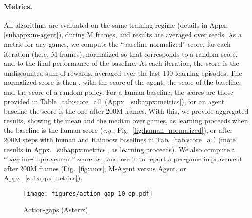 \documentclass{article}
\begin{document}
\paragraph{Metrics.}
All algorithms are evaluated on the same training regime (details in Appx.\ref{subappx:m-agent}), during M frames, and results are averaged over  seeds. As a metric for any games, we compute the ``baseline-normalized'' score, for each iteration (here, M frames), normalized so that  corresponds to a random score, and  to the final performance of the baseline. At each iteration, the score is the undiscounted sum of rewards, averaged over the last 100 learning episodes. The normalized score is then , with  the score of the agent,  the score of the baseline, and  the score of a random policy. For a human baseline, the scores are those provided in Table~\ref{tab:score_all} (Appx.~\ref{subappx:metrics}), for an agent baseline the score is the one after 200M frames. With this, we provide aggregated results, showing the mean and the median over games, as learning proceeds when the baseline is the human score (\textit{e.g.}, Fig.~\ref{fig:human_normalized}), or after 200M steps with human and Rainbow baselines in Tab.~\ref{tab:score_all} (more results in Appx.~\ref{subappx:metrics}, as learning proceeds). We also compute a ``baseline-improvement'' score as , and use it to report a per-game improvement after 200M frames (Fig.~\ref{fig:aucs}, M-Agent versus Agent, or Appx.~\ref{subappx:metrics}).


\begin{wrapfigure}{r}{0.41\textwidth}
\vspace{-25pt}
    \centering
    \texttt{[image: figures/action\_gap\_10\_ep.pdf]}
    \caption{Action-gaps (Asterix).}
    \label{fig:action_gap}
\end{wrapfigure}
\end{document}
